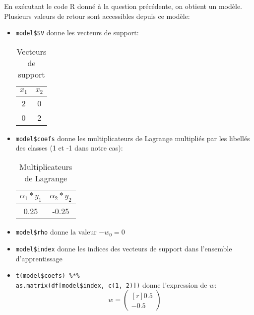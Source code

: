 \documentclass{article}
\begin{document}
\begin{multicols}{2}
En exécutant le code R donné à la question précédente, on obtient un modèle.
Plusieurs valeurs de retour sont accessibles depuis ce modèle:
\begin{itemize}
    \item \texttt{model\$SV} donne les vecteurs de support:
        \begin{table}[H]
            \begin{center}
                \centering
                \captionsetup{justification=centering}
                \caption{\label{tab:svEx1}Vecteurs de support}
                \begin{tabular}{|c|c|}
                    \hline
                    $x_1$ & $x_2$ \\
                    \hline
                    2 & 0 \\
                    0 & 2 \\
                    \hline
                \end{tabular}
            \end{center}
        \end{table}
    \item \texttt{model\$coefs} donne les multiplicateurs de Lagrange multipliés
        par les libellés des classes (1 et -1 dans notre cas):
        \begin{table}[H]
            \begin{center}
                \centering
                \captionsetup{justification=centering}
                \caption{\label{tab:svEx1}Multiplicateurs de Lagrange}
                \begin{tabular}{|c|c|}
                    \hline
                    $\alpha_1 * y_1$ & $\alpha_2 * y_2$ \\
                    \hline
                    0.25 & -0.25 \\
                    \hline
                \end{tabular}
            \end{center}
        \end{table}
    \item \texttt{model\$rho} donne la valeur $-w_0 = 0$
    \item \texttt{model\$index} donne les indices des vecteurs de support dans
        l'ensemble d'apprentissage
    \item \texttt{t(model\$coefs) \%*\%} \\
            \texttt{as.matrix(df[model\$index, c(1, 2)])} donne l'expression de
            $w$:
            \begin{equation}
                w = \begin{pmatrix*}[r]
                    0.5 \\
                    -0.5
                \end{pmatrix*}
            \end{equation}
\end{itemize}


\end{multicols}
\end{document}
